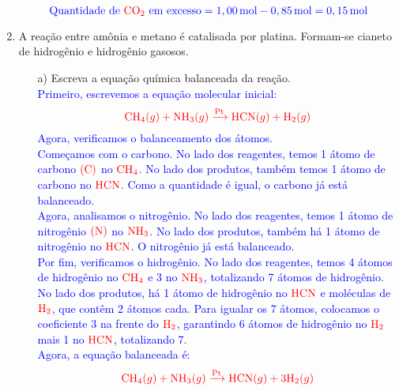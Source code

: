 \documentclass[a4paper, 12pt]{article}
\begin{document}
\begin{enumerate}
          \[
              \textcolor{blue}{\text{Quantidade de } \textcolor{red}{\text{CO}_2} \text{ em excesso} = 1,00 \, \text{mol} - 0,85 \, \text{mol} = 0,15 \, \text{mol}}
          \]




    \item A reação entre amônia e metano é catalisada por platina. Formam-se
          cianeto de hidrogênio e hidrogênio gasosos.
          \begin{enumerate}[align=left, labelsep=-0.5em]
              \item[a)] Escreva a equação química balanceada da reação.
                    \\[10pt]
                    \textcolor{blue}{Primeiro, escrevemos a equação molecular inicial:}
                    \[
                        \textcolor{red}{\text{CH}_4 (g) + \text{NH}_3 (g) \xrightarrow{\text{Pt}} \text{HCN} (g) + \text{H}_2 (g)}
                    \]
                    \textcolor{blue}{Agora, verificamos o balanceamento dos átomos.}
                    \\[10pt]
                    \textcolor{blue}{Começamos com o carbono. No lado dos reagentes, temos 1 átomo de carbono \(\textcolor{red}{(\text{C})}\) no \(\textcolor{red}{\text{CH}_4}\). No lado dos produtos, também temos 1 átomo de carbono no \(\textcolor{red}{\text{HCN}}\). Como a quantidade é igual, o carbono já está balanceado.}
                    \\[10pt]
                    \textcolor{blue}{Agora, analisamos o nitrogênio. No lado dos reagentes, temos 1 átomo de nitrogênio \(\textcolor{red}{(\text{N})}\) no \(\textcolor{red}{\text{NH}_3}\). No lado dos produtos, também há 1 átomo de nitrogênio no \(\textcolor{red}{\text{HCN}}\). O nitrogênio já está balanceado.}
                    \\[10pt]
                    \textcolor{blue}{Por fim, verificamos o hidrogênio. No lado dos reagentes, temos 4 átomos de hidrogênio no \(\textcolor{red}{\text{CH}_4}\) e 3 no \(\textcolor{red}{\text{NH}_3}\), totalizando 7 átomos de hidrogênio. No lado dos produtos, há 1 átomo de hidrogênio no \(\textcolor{red}{\text{HCN}}\) e moléculas de \(\textcolor{red}{\text{H}_2}\), que contêm 2 átomos cada. Para igualar os 7 átomos, colocamos o coeficiente 3 na frente do \(\textcolor{red}{\text{H}_2}\), garantindo 6 átomos de hidrogênio no \(\textcolor{red}{\text{H}_2}\) mais 1 no \(\textcolor{red}{\text{HCN}}\), totalizando 7.}
                    \\[10pt]
                    \textcolor{blue}{Agora, a equação balanceada é:}
                    \[
                        \textcolor{red}{\text{CH}_4 (g) + \text{NH}_3 (g) \xrightarrow{\text{Pt}} \text{HCN} (g) + 3 \text{H}_2 (g)}
                    \]


\end{enumerate}
\end{enumerate}
\end{document}
